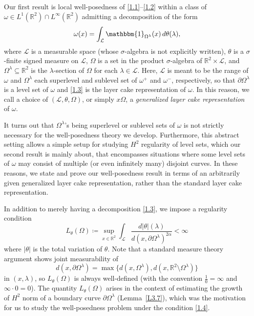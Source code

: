 \documentclass[reqno,centertags,12pt]{amsart}
\theoremstyle{definition}
\numberwithin{equation}{section}
\newcommand{\abs}[1]{\left\lvert#1\right\rvert}
\newcommand{\bbR}{{\mathbb{R}}}
\newcommand{\tht}{\theta}
\begin{document}
Our first result is local well-posedness of \eqref{1.1}--\eqref{1.2}
within a class of $\omega\in L^{1}(\bbR^{2})\cap L^{\infty}(\bbR^{2})$
admitting a decomposition of the form
\begin{equation}\label{1.3}
    \omega(x) = \int_{\mathcal{L}}\mathbbm{1}_{\Omega^{\lambda}}(x)\,d\theta(\lambda),
\end{equation}
where $\mathcal{L}$ is a measurable space (whose $\sigma$-algebra is not explicitly written),
$\theta$ is a $\sigma$-finite signed measure on $\mathcal{L}$, $\Omega$ is a set in
the product $\sigma$-algebra of $\bbR^{2}\times\mathcal{L}$,
and $\Omega^{\lambda}\subseteq\bbR^{2}$ is the $\lambda$-section of $\Omega$
for each $\lambda\in\mathcal{L}$.
Here, $\mathcal{L}$ is meant to be the range of $\omega$ and
$\Omega^{\lambda}$ each superlevel and sublevel set of $\omega^{+}$ and $\omega^{-}$,
respectively, so that $\partial\Omega^{\lambda}$ is a level set of $\omega$
and \eqref{1.3} is the layer cake representation of $\omega$.
In this reason, we call a choice of $(\mathcal{L},\theta,\Omega)$, or simply $x\Omega$,
a \emph{generalized layer cake representation} of $\omega$.

It turns out that $\Omega^{\lambda}$'s being superlevel or sublevel sets of $\omega$
is not strictly necessary for the well-posedness theory we develop.
Furthermore, this abstract setting allows a simple setup for
studying $H^{2}$ regularity of level sets, which our second result is mainly about,
that encompasses situations where some level sets of $\omega$
may consist of multiple (or even infinitely many) disjoint curves.
In these reasons, we state and prove our well-posedness result in terms of
an arbitrarily given generalized layer cake representation, rather than
the standard layer cake representation.

In addition to merely having a decomposition \eqref{1.3},
we impose a regularity condition
\begin{equation}\label{1.4}
    L_{\tht}(\Omega)\coloneqq \sup_{x\in\bbR^{2}}\int_{\mathcal{L}}
    \frac{d|\theta|(\lambda)}{d(x,\partial\Omega^{\lambda})^{2\alpha}} < \infty
\end{equation}
where $\abs{\theta}$ is the total variation of $\theta$. 
Note that a standard measure theory argument shows joint measurability of
\[
    d(x,\partial\Omega^{\lambda}) = \max\{
        d(x,\Omega^{\lambda}),
        d(x,\bbR^{2}\setminus\Omega^{\lambda})
    \}
\]
in $(x,\lambda)$, so $L_{\tht}(\Omega)$ is always well-defined
(with the convention $\frac{1}{0} = \infty$ and $\infty\cdot 0 = 0$).
The quantity $L_{\tht}(\Omega)$ arises in the context of estimating the growth of
$H^{2}$ norm of a boundary curve $\partial\Omega^{\lambda}$ (Lemma~\ref{L3.7}),
which was the motivation for us to study the well-posedness problem
under the condition \eqref{1.4}.
\end{document}
